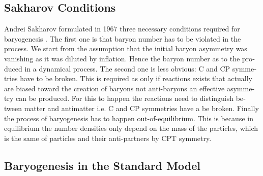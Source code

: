 \documentclass[master,       %
               twoside,        %
               BCOR10mm,       %
               english,ngerman, %
               ]{GAUBM}
\begin{document}
\begin{otherlanguage}{english}
\subsection{Sakharov Conditions}
Andrei Sakharov formulated in 1967 three necessary conditions required for baryogenesis \cite{Sakharov_1991}.
The first one is that baryon number has to be violated in the process. We start from the assumption that the initial baryon asymmetry was vanishing as it was diluted by inflation.
Hence the baryon number as to the produced in a dynamical process.
The second one is less obvious: C and CP symmetries have to be broken.
This is required as only if
reactions exists that actually are biased toward the creation of baryons not anti-baryons an effective asymmetry can be produced.
For this to happen the reactions need to distinguish between matter and antimatter i.e. C and CP symmetries have a be broken.
Finally the process of baryogenesis has to happen out-of-equilibrium. This is because
in equilibrium the number densities only depend on the mass of the particles, which is the same of particles and their anti-partners by CPT symmetry.


\subsection{Baryogenesis in the Standard Model}
\label{sec:baryogenesis_in_the_standard_model}


\end{otherlanguage}
\end{document}
